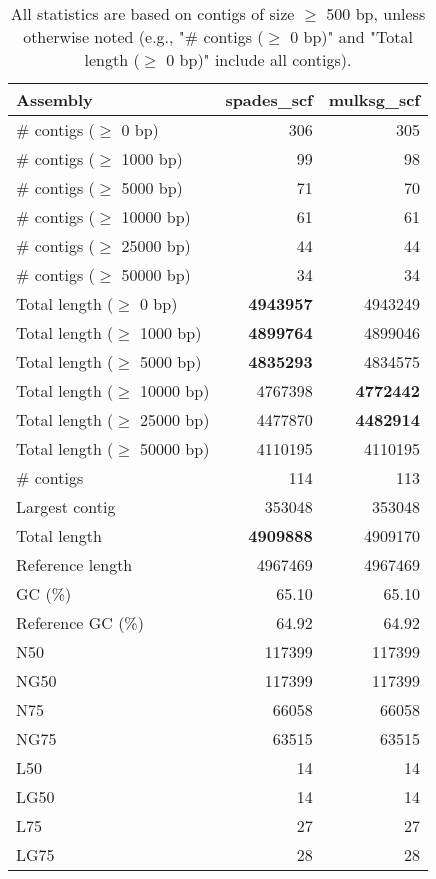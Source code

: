 \documentclass[12pt,a4paper]{article}
\begin{document}
\begin{table}[ht]
\begin{center}
\caption{All statistics are based on contigs of size $\geq$ 500 bp, unless otherwise noted (e.g., "\# contigs ($\geq$ 0 bp)" and "Total length ($\geq$ 0 bp)" include all contigs).}
\begin{tabular}{|l*{2}{|r}|}
\hline
Assembly & spades\_scf & mulksg\_scf \\ \hline
\# contigs ($\geq$ 0 bp) & 306 & 305 \\ \hline
\# contigs ($\geq$ 1000 bp) & 99 & 98 \\ \hline
\# contigs ($\geq$ 5000 bp) & 71 & 70 \\ \hline
\# contigs ($\geq$ 10000 bp) & 61 & 61 \\ \hline
\# contigs ($\geq$ 25000 bp) & 44 & 44 \\ \hline
\# contigs ($\geq$ 50000 bp) & 34 & 34 \\ \hline
Total length ($\geq$ 0 bp) & {\bf 4943957} & 4943249 \\ \hline
Total length ($\geq$ 1000 bp) & {\bf 4899764} & 4899046 \\ \hline
Total length ($\geq$ 5000 bp) & {\bf 4835293} & 4834575 \\ \hline
Total length ($\geq$ 10000 bp) & 4767398 & {\bf 4772442} \\ \hline
Total length ($\geq$ 25000 bp) & 4477870 & {\bf 4482914} \\ \hline
Total length ($\geq$ 50000 bp) & 4110195 & 4110195 \\ \hline
\# contigs & 114 & 113 \\ \hline
Largest contig & 353048 & 353048 \\ \hline
Total length & {\bf 4909888} & 4909170 \\ \hline
Reference length & 4967469 & 4967469 \\ \hline
GC (\%) & 65.10 & 65.10 \\ \hline
Reference GC (\%) & 64.92 & 64.92 \\ \hline
N50 & 117399 & 117399 \\ \hline
NG50 & 117399 & 117399 \\ \hline
N75 & 66058 & 66058 \\ \hline
NG75 & 63515 & 63515 \\ \hline
L50 & 14 & 14 \\ \hline
LG50 & 14 & 14 \\ \hline
L75 & 27 & 27 \\ \hline
LG75 & 28 & 28 \\ \hline

\end{tabular}
\end{center}
\end{table}
\end{document}
